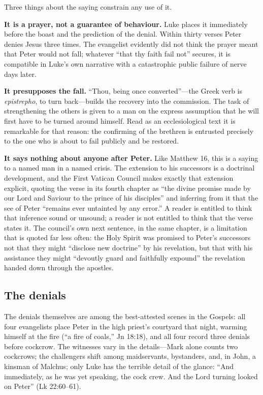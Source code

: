 Three things about the saying constrain any use of it.

\textbf{It is a prayer, not a guarantee of behaviour.} Luke places it
immediately before the boast and the prediction of the denial. Within thirty
verses Peter denies Jesus three times. The evangelist evidently did not think
the prayer meant that Peter would not fall; whatever ``that thy faith fail
not'' secures, it is compatible in Luke's own narrative with a catastrophic
public failure of nerve days later.

\textbf{It presupposes the fall.} ``Thou, being once converted''---the Greek
verb is \textit{epistrepho}, to turn back---builds the recovery into the
commission. The task of strengthening the others is given to a man on the
express assumption that he will first have to be turned around himself. Read
as an ecclesiological text it is remarkable for that reason: the confirming
of the brethren is entrusted precisely to the one who is about to fail
publicly and be restored.

\textbf{It says nothing about anyone after Peter.} Like Matthew 16, this is a
saying to a named man in a named crisis. The extension to his successors is a
doctrinal development, and the First Vatican Council makes exactly that
extension explicit, quoting the verse in its fourth chapter as ``the divine
promise made by our Lord and Saviour to the prince of his disciples'' and
inferring from it that the see of Peter ``remains ever untainted by any
error.'' A reader is entitled to think that inference sound or unsound; a
reader is not entitled to think that the verse states it. The council's own
next sentence, in the same chapter, is a limitation that is quoted far less
often: the Holy Spirit was promised to Peter's successors not that they might
``disclose new doctrine'' by his revelation, but that with his assistance
they might ``devoutly guard and faithfully expound'' the revelation handed
down through the apostles.

\subsection{The denials}

The denials themselves are among the best-attested scenes in the Gospels:
all four evangelists place Peter in the high priest's courtyard that night,
warming himself at the fire (``a fire of coals,'' Jn 18:18), and all four
record three denials before cockcrow. The witnesses vary in the
details---Mark alone counts two cockcrows; the challengers shift among
maidservants, bystanders, and, in John, a kinsman of Malchus; only Luke has
the terrible detail of the glance: ``And immediately, as he was yet speaking,
the cock crew. And the Lord turning looked on Peter'' (Lk 22:60--61).

